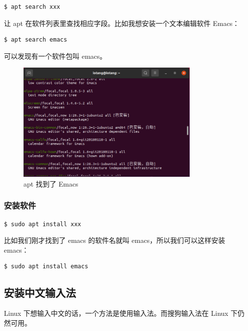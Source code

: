 \documentclass[UTF-8]{ctexart}
\begin{document}
				\begin{verbatim}
$ apt search xxx
				\end{verbatim}
			
				让 apt 在软件列表里查找相应字段。比如我想安装一个文本编辑软件 Emacs：
				
				\begin{verbatim}
$ apt search emacs
				\end{verbatim}
			
				可以发现有一个软件包叫 emacs。
				
				\begin{figure}[H]
					\centering
					\includegraphics[width=0.8\textwidth]{fig/apt_find_emacs.png}
					\caption*{apt 找到了 Emacs}
				\end{figure}

			\subsubsection{安装软件}
		
				\begin{verbatim}
$ sudo apt install xxx
				\end{verbatim}
				
				比如我们刚才找到了 emacs 的软件名就叫 emacs，所以我们可以这样安装 emacs：
				
				\begin{verbatim}
$ sudo apt install emacs
				\end{verbatim}
			
		\subsection{安装中文输入法}
		
			Linux 下想输入中文的话，一个方法是使用输入法。而搜狗输入法在 Linux 下仍然可用。
			
\end{document}
